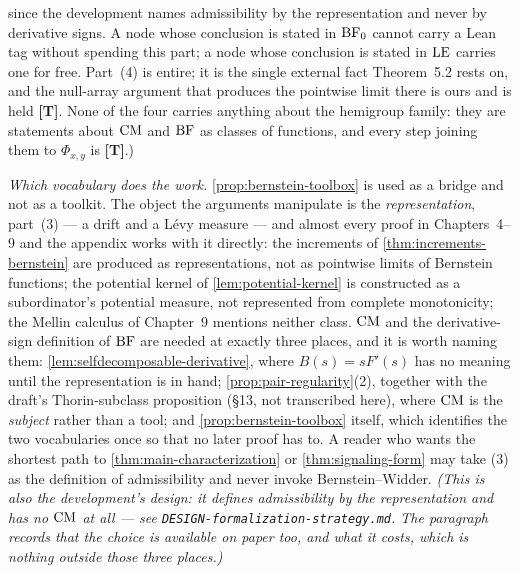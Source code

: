 \begin{proposition}
{since the development names admissibility by the representation and never by derivative signs.
A node whose conclusion is stated in $\mathrm{BF}_0$ cannot carry a Lean tag without spending this part;
a node whose conclusion is stated in $\mathrm{LE}$ carries one for free.
Part~(4) is  entire; it is the single external fact
Theorem~5.2 rests on, and the null-array argument that produces the pointwise limit there is
ours and is held \textbf{[T]}. None of the four carries anything about the hemigroup family:
they are statements about $\mathrm{CM}$ and $\mathrm{BF}$ as classes of functions, and every step joining
them to $\Phi_{x,y}$ is \textbf{[T]}.)}
\end{proposition}

\emph{Which vocabulary does the work.} \ref{prop:bernstein-toolbox} is used as a bridge and not as
a toolkit. The object the arguments manipulate is the \emph{representation}, part~(3) --- a drift
and a Lévy measure --- and almost every proof in Chapters~4--9 and the appendix works with it directly: the
increments of \ref{thm:increments-bernstein} are produced as representations, not as pointwise
limits of Bernstein functions; the potential kernel of \ref{lem:potential-kernel} is constructed as
a subordinator's potential measure, not represented from complete monotonicity; the Mellin calculus
of Chapter~9 mentions neither class. $\mathrm{CM}$ and the derivative-sign definition of $\mathrm{BF}$ are needed
at exactly three places, and it is worth naming them: \ref{lem:selfdecomposable-derivative}, where
$B(s) = sF'(s)$ has no meaning until the representation is in hand; \ref{prop:pair-regularity}(2),
together with the draft's Thorin-subclass proposition (\S13, not transcribed here), where $\mathrm{CM}$ is
the \emph{subject} rather than a tool; and
\ref{prop:bernstein-toolbox} itself, which identifies the two vocabularies once so that no later
proof has to. A reader who wants the shortest path to \ref{thm:main-characterization} or
\ref{thm:signaling-form} may take (3) as the definition of admissibility and never invoke
Bernstein--Widder. \emph{(This is also the development's design: it defines admissibility by the
representation and has no $\mathrm{CM}$ at all --- see \texttt{DESIGN-formalization-strategy.md}. The
paragraph records that the choice is available on paper too, and what it costs, which is nothing
outside those three places.)}


